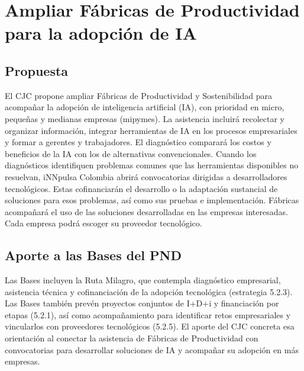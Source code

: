 
\section{Ampliar Fábricas de Productividad para la adopción de IA}
\label{prop:1}
\label{prop:4}

\subsection{Propuesta}

El CJC propone ampliar Fábricas de Productividad y Sostenibilidad para acompañar la adopción de inteligencia artificial (IA), con prioridad en micro, pequeñas y medianas empresas (mipymes). La asistencia incluirá recolectar y organizar información, integrar herramientas de IA en los procesos empresariales y formar a gerentes y trabajadores. El diagnóstico comparará los costos y beneficios de la IA con los de alternativas convencionales. Cuando los diagnósticos identifiquen problemas comunes que las herramientas disponibles no resuelvan, iNNpulsa Colombia abrirá convocatorias dirigidas a desarrolladores tecnológicos. Estas cofinanciarán el desarrollo o la adaptación sustancial de soluciones para esos problemas, así como sus pruebas e implementación. Fábricas acompañará el uso de las soluciones desarrolladas en las empresas interesadas. Cada empresa podrá escoger su proveedor tecnológico.


\subsection{Aporte a las Bases del PND}

Las Bases incluyen la Ruta Milagro, que contempla diagnóstico empresarial, asistencia técnica y cofinanciación de la adopción tecnológica (estrategia 5.2.3). Las Bases también prevén proyectos conjuntos de I+D+i y financiación por etapas (5.2.1), así como acompañamiento para identificar retos empresariales y vincularlos con proveedores tecnológicos (5.2.5). El aporte del CJC concreta esa orientación al conectar la asistencia de Fábricas de Productividad con convocatorias para desarrollar soluciones de IA y acompañar su adopción en más empresas.

